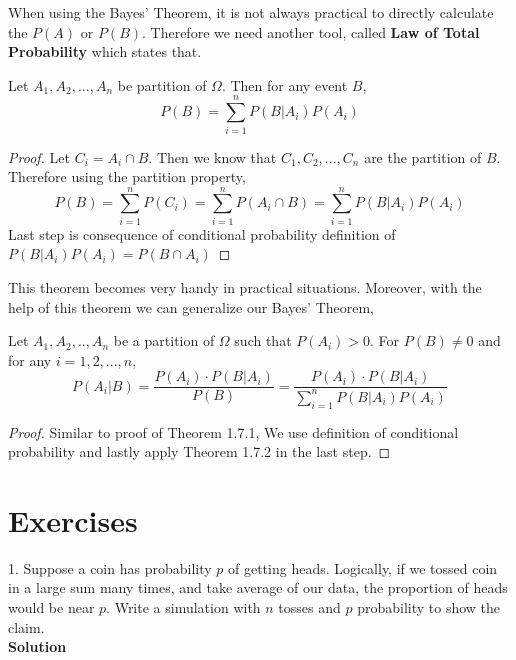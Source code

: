 \par 

When using the Bayes' Theorem, it is not always practical to directly calculate the $P(A)$ or $P(B)$. Therefore we need another tool, called \textbf{Law of Total Probability} which states that.
\\
\begin{theorem} Let $A_1,A_2,...,A_n$ be partition of $\Omega$. Then for any event $B$,
    $$P(B)= \sum_{i=1}^n P(B|A_i)P(A_i)$$
    
\end{theorem}
\begin{proof}
    Let $C_i=A_i \cap B$. Then we know that $C_1,C_2,...,C_n$ are the partition of $B$. Therefore using the partition property,
    $$ P(B)= \sum_{i=1}^n P(C_i) = \sum_{i=1}^n P(A_i \cap B) =\sum_{i=1}^n P(B|A_i)P(A_i) $$
    Last step is consequence of conditional probability definition of $P(B|A_i)P(A_i)=P(B \cap A_i)$
\end{proof}

\par
This theorem becomes very handy in practical situations. Moreover, with the help of this theorem we can generalize our Bayes' Theorem,

\begin{theorem} Let $A_1,A_2,..,A_n$ be a partition of $\Omega$ such that $P(A_i) > 0$. For $P(B) \neq 0$ and for any $i=1,2,...,n$,
    $$ P(A_i|B) = \frac{P(A_i) \cdot P(B|A_i)}{P(B)} =  \frac{P(A_i) \cdot P(B|A_i)}{\sum_{i=1}^n P(B|A_i)P(A_i) }$$
\end{theorem}
\begin{proof}
    Similar to proof of Theorem 1.7.1, We use definition of conditional probability and  lastly apply Theorem 1.7.2  in the last step.
\end{proof}

\section{Exercises}

     1. Suppose a coin has probability  $p$ of getting heads. Logically, if we tossed coin in a large sum many times, and take average of our data, the proportion of heads would be near $p$. Write a simulation with $n$ tosses and $p$ probability to show the claim. \\
    \textbf{Solution}      

    \inputminted{python}{src/chapter1/1.py} 
    \begin{center}  \end{center}

